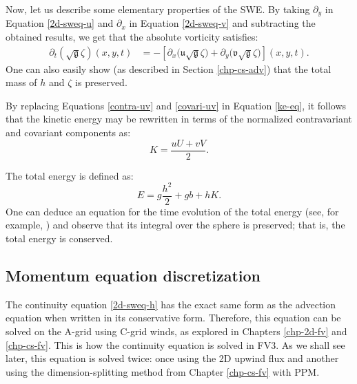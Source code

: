 Now, let us describe some elementary properties of the SWE.
By taking $\partial_y$ in Equation \eqref{2d-sweq-u} and $\partial_x$ in Equation \eqref{2d-sweq-v} and
subtracting the obtained results, we get that the absolute vorticity satisfies:
\begin{align}
	\label{absvort-eq}
	{\partial_t (\sqrt{\mathfrak{g}} {\zeta})}(x,y,t) & = 
	-[{\partial_x (\mathfrak{u}\sqrt{\mathfrak{g}}{\zeta}})
	+ {\partial_y (\mathfrak{v}\sqrt{\mathfrak{g}}{\zeta}})](x,y,t).
\end{align}
One can also easily show (as described in Section \ref{chp-cs-adv}) that the total mass of $h$ and $\zeta$ is preserved.

By replacing Equations \eqref{contra-uv} and \eqref{covari-uv} in Equation \eqref{ke-eq}, 
it follows that the kinetic energy may be rewritten in terms of the normalized contravariant and covariant components as:
\begin{equation}
	\label{ke-eq2}
	K = \frac{{u}{U}+{v}{V}}{2}.
\end{equation}

The total energy is defined as:
\begin{equation}
	\label{energy}
	E = g\frac{h^2}{2} + gb + hK.
\end{equation}
One can deduce an equation for the time evolution of the total energy (see, for example, \citet{ringler:2010}) 
and observe that its integral over the sphere is preserved; that is, the total energy is conserved.

\subsection{Momentum equation discretization}
The continuity equation \eqref{2d-sweq-h} has the exact same form as the advection equation when written in its conservative form.
Therefore, this equation can be solved on the A-grid using C-grid winds, as explored in Chapters \ref{chp-2d-fv} and \ref{chp-cs-fv}.
This is how the continuity equation is solved in FV3.
As we shall see later, this equation is solved twice: 
once using the 2D upwind flux and another using the dimension-splitting method from Chapter \ref{chp-cs-fv} with PPM.

